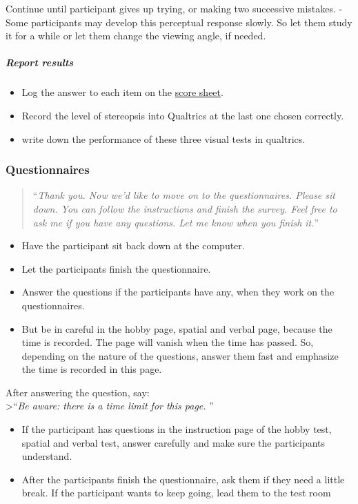 \documentclass[]{article}
\providecommand{\tightlist}{%
  \setlength{\itemsep}{0pt}\setlength{\parskip}{0pt}}
\let\oldsubparagraph\subparagraph
\renewcommand{\subparagraph}[1]{\oldsubparagraph{#1}\mbox{}}
\begin{document}
Continue until participant gives up trying, or making two successive
mistakes. - Some participants may develop this perceptual response
slowly. So let them study it for a while or let them change the viewing
angle, if needed.

\subparagraph{Report results}\label{report-results-2}

\begin{itemize}
\item
  Log the answer to each item on the
  \href{vision-screening-score-sheet.html}{score sheet}.
\item
  Record the level of stereopsis into Qualtrics at the last one chosen
  correctly.
\item
  write down the performance of these three visual tests in qualtrics.
\end{itemize}

\subsubsection{Questionnaires}\label{questionnaires}

\begin{quote}
``\emph{Thank you. Now we'd like to move on to the questionnaires.
Please sit down. You can follow the instructions and finish the survey.
Feel free to ask me if you have any questions. Let me know when you
finish it.}''
\end{quote}

\begin{itemize}
\tightlist
\item
  Have the participant sit back down at the computer.
\item
  Let the participants finish the questionnaire.
\item
  Answer the questions if the participants have any, when they work on
  the questionnaires.
\item
  But be in careful in the hobby page, spatial and verbal page, because
  the time is recorded. The page will vanish when the time has passed.
  So, depending on the nature of the questions, answer them fast and
  emphasize the time is recorded in this page.
\end{itemize}

After answering the question, say:\\
\textgreater{}``\emph{Be aware: there is a time limit for this page. }''

\begin{itemize}
\tightlist
\item
  If the participant has questions in the instruction page of the hobby
  test, spatial and verbal test, answer carefully and make sure the
  participants understand.
\item
  After the participants finish the questionnaire, ask them if they need
  a little break. If the participant wants to keep going, lead them to
  the test room
\end{itemize}
\end{document}
